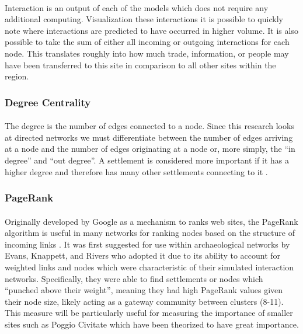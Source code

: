\documentclass[12pt,a4paper]{thesis}
\begin{document}
\paragraph{}
Interaction is an output of each of the models which does not require any additional computing. Visualization these interactions it is possible to quickly note where interactions are predicted to have occurred in higher volume. It is also possible to take the sum of either all incoming or outgoing interactions for each node. This translates roughly into how much trade, information, or people may have been transferred to this site in comparison to all other sites within the region. 

\subsubsection{Degree Centrality}
\paragraph{}
The degree is the number of edges connected to a node. Since this research looks at directed networks we must differentiate between the number of edges arriving at a node and the number of edges originating at a node or, more simply, the ``in degree'' and ``out degree''. A settlement is considered more important if it has a higher degree and therefore has many other settlements connecting to it \citep{RodComSla06}.  





\subsubsection{PageRank}
\paragraph{}
Originally developed by Google as a mechanism to ranks web sites, the PageRank algorithm is useful in many networks for ranking nodes based on the structure of incoming links \citetext{\citealp{PageRank}; \citealp{LanMey04}}. It was first suggested for use within archaeological networks by Evans, Knappett, and Rivers \citeyearpar{KnaEvaRiv08} who adopted it due to its ability to account for weighted links and nodes which were characteristic of their simulated interaction networks. Specifically, they were able to find settlements or nodes which ``punched above their weight'', meaning they had high PageRank values given their node size, likely acting as a gateway community between clusters (8-11). This measure will be particularly useful for measuring the importance of smaller sites such as Poggio Civitate which have been theorized to have great importance.
\end{document}

